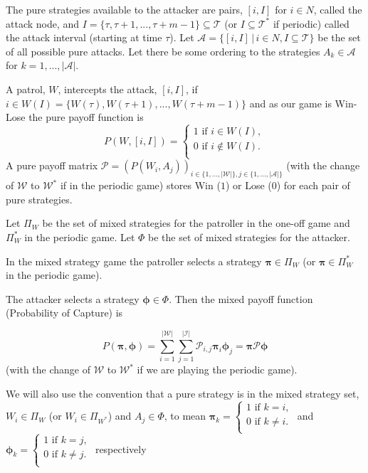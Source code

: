 \documentclass[a4paper,10pt]{article}
\theoremstyle{definition}
\theoremstyle{definition}
\theoremstyle{remark}
\theoremstyle{definition}
\begin{document}
The pure strategies available to the attacker are pairs, $[i,I]$ for $i \in N$, called the attack node, and $I=\{ \tau,\tau+1,...,\tau+m-1 \} \subseteq \mathcal{T}$ (or $I \subseteq \mathcal{T}^*$ if periodic) called the attack interval (starting at time $\tau$). Let $\mathcal{A}=\{[i,I] \, | \, i \in N , I \subseteq \mathcal{T} \}$ be the set of all possible pure attacks. Let there be some ordering to the strategies $A_{k} \in \mathcal{A}$ for $k=1,...,|\mathcal{A}|$.

A patrol, $W$, intercepts the attack, $[i,I]$, if $i \in W(I)=\{W(\tau),W(\tau+1),...,W(\tau+m-1)\}$ and as our game is Win-Lose the pure payoff function is
$$P(W,[i,I])=\left\{ \begin{array}{l}
1 \text{  if  } i \in W(I) ,\\
0 \text{  if  } i \notin W(I) .\\
\end{array}\right.$$
A pure payoff matrix $\mathcal{P}=(P(W_{i},A_{j}))_{i \in \{ 1,...,|\mathcal{W}| \}, j \in \{ 1,...,|\mathcal{A}| \}}$ (with the change of $\mathcal{W}$ to $\mathcal{W}^*$ if in the periodic game) stores Win ($1$) or Lose ($0$) for each pair of pure strategies.

Let $\Pi_{W}$ be the set of mixed strategies for the patroller in the one-off game and $\Pi_{W}^*$ in the periodic game. Let $\Phi$ be the set of mixed strategies for the attacker.

In the mixed strategy game the patroller selects a strategy $\bm{\pi} \in \Pi_{W}$ (or $\bm{\pi}  \in \Pi_{W}^*$ in the periodic game).

The attacker selects a strategy $\bm{\phi} \in \Phi$. Then the mixed payoff function (Probability of Capture) is

$$
P(\bm{\pi} ,\bm{\phi})=\sum\limits_{i=1}^{|\mathcal{W}|} \sum\limits_{j=1}^{|\mathcal{I}|} \mathcal{P}_{i,j} \bm{\pi} _{i} \bm{\phi}_{j}
=\bm{\pi} \mathcal{P} \bm{\phi}
$$
(with the change of $\mathcal{W}$ to $\mathcal{W}^*$ if we are playing the periodic game).

We will also use the convention that a pure strategy is in the mixed strategy set, $W_{i} \in \Pi_{W}$ (or $W_{i} \in \Pi_{W^*}$) and $A_{j} \in \Phi$, to mean $\bm{\pi}_{k}=\left\{\begin{array}{c}
1 \text{ if } k=i, \\
0 \text{ if } k \neq i. \\
\end{array} \right.$
and
$\bm{\phi}_{k}=\left\{\begin{array}{c}
1 \text{ if } k=j, \\
0 \text{ if } k \neq j. \\
\end{array} \right.$ respectively
\end{document}
